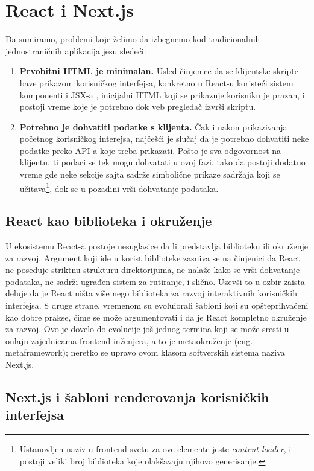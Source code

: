 \documentclass[12pt,oneside]{memoir}
\begin{document}
\section{React i Next.js}
Da sumiramo, problemi koje želimo da izbegnemo kod tradicionalnih jednostraničnih aplikacija jesu sledeći:
\begin{enumerate}
    \item \textbf{Prvobitni HTML je minimalan.} Usled činjenice da se klijentske skripte bave prikazom korisničkog interfejsa, konkretno u React-u koristeći sistem komponenti i JSX-a \cite{reactdocscomponents}, inicijalni HTML koji se prikazuje korisniku je prazan, i postoji vreme koje je potrebno dok veb pregledač izvrši skriptu.
    \item \textbf{Potrebno je dohvatiti podatke s klijenta.} Čak i nakon prikazivanja početnog korisničkog interejsa, najčešći je slučaj da je potrebno dohvatiti neke podatke preko API-a koje treba prikazati. Pošto je sva odgovornost na klijentu, ti podaci se tek mogu dohvatati u ovoj fazi, tako da postoji dodatno vreme gde neke sekcije sajta sadrže simbolične prikaze sadržaja koji se učitava\footnote{Ustanovljen naziv u frontend svetu za ove elemente jeste \textit{content loader}, i postoji veliki broj biblioteka koje olakšavaju njihovo generisanje.}, dok se u pozadini vrši dohvatanje podataka.
\end{enumerate}

\subsection{React kao biblioteka i okruženje}

U ekosistemu React-a postoje nesuglasice da li predstavlja biblioteku ili okruženje za razvoj. Argument koji ide u korist biblioteke zasniva se na činjenici da React ne poseduje striktnu strukturu direktorijuma, ne nalaže kako se vrši dohvatanje podataka, ne sadrži ugrađen sistem za rutiranje, i slično. Uzevši to u ozbir zaista deluje da je React ništa više nego biblioteka za razvoj interaktivnih korisničkih interfejsa. S druge strane, vremenom su evoluiorali šabloni koji su opšteprihvaćeni kao dobre prakse, čime se može argumentovati i da je React kompletno okruženje za razvoj. Ovo je dovelo do evolucije još jednog termina koji se može sresti u onlajn zajednicama frontend inženjera, a to je metaokruženje (eng. metaframework); neretko se upravo ovom klasom softverskih sistema naziva Next.js.

\subsection{Next.js i šabloni renderovanja korisničkih interfejsa}
\end{document}
